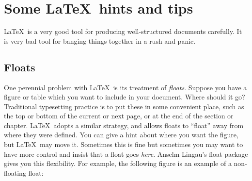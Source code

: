 \chapter{Some \LaTeX\ hints and tips}\label{C:ex}
\LaTeX\ is a very good tool for producing well-structured documents 
carefully. It is very bad tool for banging things together in a rush 
and panic. 

\section{Floats}
One perennial problem with \LaTeX\ is its treatment of 
\emph{floats}.  Suppose you have a figure or table which you want to 
include in your document. Where should it go? Traditional typesetting 
practice is to put these in some convenient place, such as the top or 
bottom of the current or next page, or at the end of the section or 
chapter.  \LaTeX\ adopts a similar strategy, and allows floats to 
``float'' away from where they were defined. You can give a hint 
about where you want the figure, but \LaTeX\ may move it. Sometimes 
this is fine but sometimes you may want to have more control and 
insist that a float goes \emph{here}. Anselm Lingau's 
\textsf{float} package gives you this flexibility. For example, the following figure is an example of a non-floating float:

